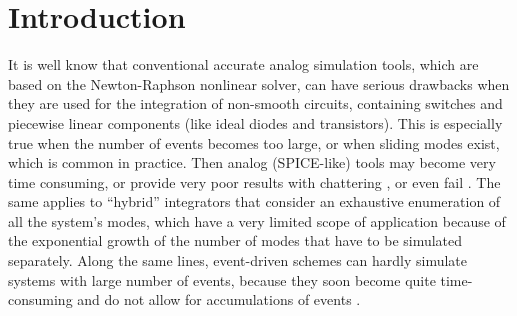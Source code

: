 

\section{Introduction}
It is well know that conventional accurate analog simulation tools, which are based on the Newton-Raphson nonlinear solver, can have serious drawbacks when they are used for the integration of non-smooth circuits, containing switches and piecewise linear components (like ideal diodes and transistors). This is especially true when the number of events becomes too large, or when sliding modes exist, which is common in practice. Then analog (SPICE-like) tools  may become very time consuming, or provide very poor results with chattering \cite{galias2006}, or even fail \cite{maffezzoni2006,yuan2003,mayaram2000,chung1994,biolek2007}. The same applies to ``hybrid'' integrators that consider an exhaustive enumeration of all the system's modes, which have a very limited scope of application because of the exponential growth of the number of modes that have to be simulated separately. Along the same lines, event-driven schemes can hardly simulate systems with large number of events, because they soon become quite time-consuming and do not allow for accumulations of events \cite{acary-brogliato2008}. 

